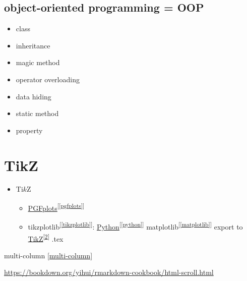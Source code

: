 \documentclass[
]{book}
\newenvironment{Shaded}{\begin{snugshade}}{\end{snugshade}}
\newcommand{\AttributeTok}[1]{\textcolor[rgb]{0.13,0.29,0.53}{#1}}
\newcommand{\FunctionTok}[1]{\textcolor[rgb]{0.13,0.29,0.53}{\textbf{#1}}}
\newcommand{\NormalTok}[1]{#1}
\newcommand{\SpecialCharTok}[1]{\textcolor[rgb]{0.81,0.36,0.00}{\textbf{#1}}}
\newcommand{\StringTok}[1]{\textcolor[rgb]{0.31,0.60,0.02}{#1}}
\providecommand{\tightlist}{%
  \setlength{\itemsep}{0pt}\setlength{\parskip}{0pt}}
\theoremstyle{definition}
\theoremstyle{definition}
\theoremstyle{definition}
\theoremstyle{definition}
\theoremstyle{remark}
\begin{document}
\hypertarget{object-oriented-programming-oop}{%
\section{object-oriented programming = OOP}\label{object-oriented-programming-oop}}

\begin{itemize}
\tightlist
\item
  class
\item
  inheritance
\item
  magic method
\item
  operator overloading
\item
  data hiding
\item
  static method
\item
  property
\end{itemize}

\hypertarget{tikz}{%
\chapter{TikZ}\label{tikz}}

\begin{itemize}
\tightlist
\item
  Ti\(k\)Z

  \begin{itemize}
  \tightlist
  \item
    \protect\hyperlink{pgfplots}{PGFplots}\textsuperscript{{[}\ref{pgfplots}{]}}
  \item
    tikzplotlib\textsuperscript{{[}\ref{tikzplotlib}{]}}: \protect\hyperlink{python}{Python}\textsuperscript{{[}\ref{python}{]}} matplotlib\textsuperscript{{[}\ref{matplotlib}{]}} export to \protect\hyperlink{tikz}{TikZ}\textsuperscript{{[}\ref{tikz}{]}} .tex
  \end{itemize}
\end{itemize}

multi-column \ref{multi-column}

\begin{Shaded}
\end{Shaded}

\url{https://bookdown.org/yihui/rmarkdown-cookbook/html-scroll.html}
\end{document}
